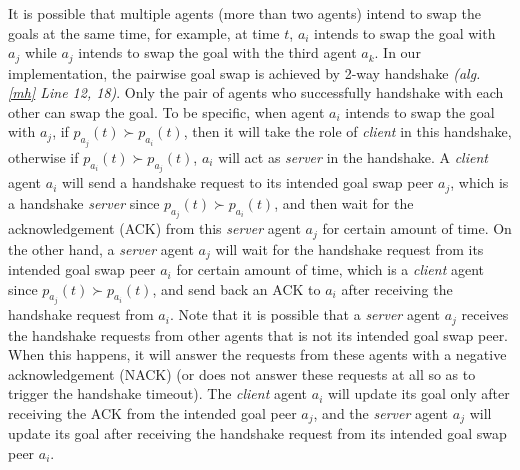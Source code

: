 \documentclass[journal]{IEEEtran}
\begin{document}
It is possible that multiple agents (more than two agents) intend to swap the goals at the same time, for example, at time $t$, $a_i$ intends to swap the goal with $a_j$ while $a_j$ intends to swap the goal with the third agent $a_k$. In our implementation, the pairwise goal swap is achieved by 2-way handshake \textit{(alg. \ref{mh} Line 12, 18)}. Only the pair of agents who successfully handshake with each other can swap the goal. To be specific, when agent $a_i$ intends to swap the goal with $a_j$, if $p_{a_j}(t)\succ p_{a_i}(t)$, then it will take the role of \textit{client} in this handshake, otherwise if $p_{a_i}(t)\succ p_{a_j}(t)$, $a_i$ will act as \textit{server} in the handshake. A \textit{client} agent $a_i$ will send a handshake request to its intended goal swap peer $a_j$, which is a handshake \textit{server} since $p_{a_j}(t)\succ p_{a_i}(t)$, and then wait for the acknowledgement (ACK) from this \textit{server} agent $a_j$ for certain amount of time. On the other hand, a \textit{server} agent $a_j$ will wait for the handshake request from its intended goal swap peer $a_i$ for certain amount of time, which is a \textit{client} agent since $p_{a_j}(t)\succ p_{a_i}(t)$, and send back an ACK to $a_i$ after receiving the handshake request from $a_i$. Note that it is possible that a \textit{server} agent $a_j$ receives the handshake requests from other agents that is not its intended goal swap peer. When this happens, it will answer the requests from these agents with a negative acknowledgement (NACK) (or does not answer these requests at all so as to trigger the handshake timeout). The \textit{client} agent $a_i$ will update its goal only after receiving the ACK from the intended goal peer $a_j$, and the \textit{server} agent $a_j$ will update its goal after receiving the handshake request from its intended goal swap peer $a_i$.
\end{document}
